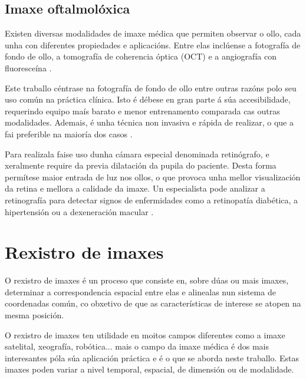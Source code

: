\subsection{Imaxe oftalmolóxica}
\label{subsec:Imaxe oftalmolóxica}
Existen diversas modalidades de imaxe médica que permiten observar o ollo, cada unha con diferentes propiedades e aplicacións. 
Entre elas inclúense a fotografía de fondo de ollo, a tomografía de coherencia óptica (OCT) e a angiografía con fluoresceína \cite{ilginis2014ophthalmic}.

Este traballo céntrase na fotografía de fondo de ollo entre outras razóns polo seu uso común na práctica clínica.
Isto é débese en gran parte á súa accesibilidade, requerindo equipo maís barato e menor entrenamento comparada cas outras modalidades. 
Ademais, é unha técnica non invasiva e rápida de realizar, o que a fai preferible na maioría dos casos \cite{retinimaging}.

Para realizala faise uso dunha cámara especial denominada retinógrafo, e xeralmente require da previa dilatación da pupila do paciente.
Desta forma permítese maior entrada de luz nos ollos, o que provoca unha mellor visualización da retina e mellora a calidade da imaxe.
Un especialista pode analizar a retinografía para detectar signos de enfermidades como a retinopatía diabética, a hipertensión ou a dexeneración macular \cite{retreggood}.

\section{Rexistro de imaxes}
\label{sec:Rexistro de imaxes}
O rexistro de imaxes é un proceso que consiste en, sobre dúas ou mais imaxes, determinar a correspondencia espacial entre elas
 e alinealas nun sistema de coordenadas común, co obxetivo de que as características de interese se atopen na mesma posición.


O rexistro de imaxes ten utilidade en moitos campos diferentes como a imaxe satelital, xeografía, robótica... \cite{goshtasby2017theory} mais o 
campo da imaxe médica é dos mais interesantes póla súa aplicación práctica e é o que se aborda neste traballo.
Estas imaxes poden variar a nivel temporal, espacial, de dimensión ou de modalidade.

